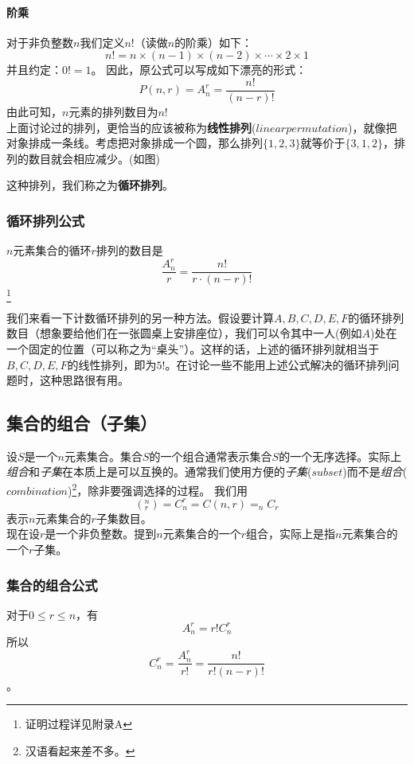 \documentclass{ctexart}
\begin{document}
    \paragraph{阶乘} 对于非负整数$n$我们定义$n!$（读做$n$的阶乘）如下：
    \[n! = n \times (n-1) \times (n-2) \times \cdots \times 2 \times 1\]
    并且约定：$0! = 1$。
    因此，原公式可以写成如下漂亮的形式：
    \[P(n,r) = A_n^r = \frac{n!}{(n-r)!}\]
    由此可知，$n$元素的排列数目为$n!$\\
    上面讨论过的排列，更恰当的应该被称为\textbf{线性排列}($linear permutation$)，就像把对象排成一条线。考虑把对象排成一个圆，那么排列$\{1,2,3\}$就等价于$\{3,1,2\}$，排列的数目就会相应减少。(如图)
    \begin{center}
    \end{center}
    这种排列，我们称之为\textbf{循环排列}。
   \subsubsection{循环排列公式}
   $n$元素集合的循环$r$排列的数目是
   \[\frac{A_n^r}{r} = \frac{n!}{r \cdot (n-r)!}\]
   \footnote{证明过程详见附录A}

   我们来看一下计数循环排列的另一种方法。假设要计算$A,B,C,D,E,F$的循环排列数目（想象要给他们在一张圆桌上安排座位），我们可以令其中一人(例如$A$)处在一个固定的位置（可以称之为“桌头”）。这样的话，上述的循环排列就相当于$B,C,D,E,F$的线性排列，即为$5!$。在讨论一些不能用上述公式解决的循环排列问题时，这种思路很有用。


   \subsection{集合的组合（子集）}
   设$S$是一个$n$元素集合。集合$S$的一个组合通常表示集合$S$的一个无序选择。实际上\textit{组合}和\textit{子集}在本质上是可以互换的。通常我们使用方便的\textit{子集}($subset$)而不是\textit{组合}($combination$)\footnote{汉语看起来差不多。}，除非要强调选择的过程。
   我们用
   \[(_r^n) = C_n^r = C(n,r) = _nC_r\]
   表示$n$元素集合的$r$子集数目。\\
   现在设$r$是一个非负整数。提到$n$元素集合的一个$r$组合，实际上是指$n$元素集合的一个$r$子集。
   \subsubsection{集合的组合公式}对于$0 \leqslant r \leqslant n$，有
   \[A_n^r =r!C_n^r \]
   所以\[C_n^r = \frac{A_n^r}{r!} = \frac{n!}{r!(n-r)!}\]。
\end{document}
